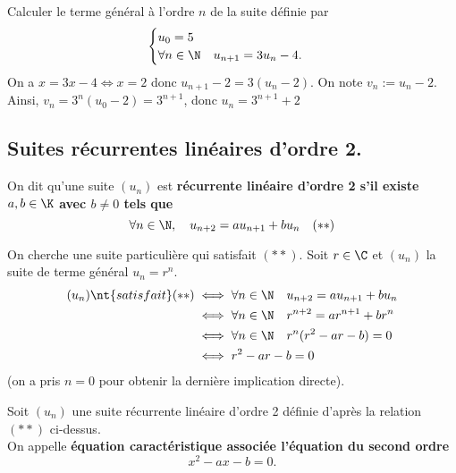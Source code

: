 \documentclass[11pt]{article}
\begin{document}
\begin{ex}{}{}
    Calculer le terme général à l'ordre $n$ de la suite définie par
    \begin{equation*}
        \begin{cases}
            u_0 = 5\\
            \forall n \in \N \quad u_{n+1} = 3u_n - 4.
        \end{cases}
    \end{equation*}
    \tcblower
    On a $x=3x-4\iff x=2$ donc $u_{n+1}-2=3(u_n-2)$. On note $v_n:=u_n-2$.\\
    Ainsi, $v_n=3^n(u_0-2)=3^{n+1}$, donc $u_n=3^{n+1}+2$
\end{ex}

\subsection{Suites récurrentes linéaires d'ordre 2.}

\begin{defi}{}{}
    On dit qu'une suite $(u_n)$ est \bf{récurrente linéaire d'ordre 2} s'il existe $a,b\in\K$ avec $b\neq0$ tels que
    \begin{equation*}
        \forall n \in \N, \quad u_{n+2}=au_{n+1}+bu_n \quad (**)
    \end{equation*}
\end{defi}
On cherche une suite particulière qui satisfait $(**)$. Soit $r\in\C$ et $(u_n)$ la suite de terme général $u_n=r^n$.
\begin{align*}
    (u_n) \nt{ satisfait } (**) &\iff \forall n \in \N \quad u_{n+2} = au_{n+1} + bu_n\\
    &\iff \forall n \in \N \quad r^{n+2} = ar^{n+1} + br^n\\
    &\iff \forall n \in \N \quad r^n(r^2 - ar - b) = 0\\
    &\iff r^2 - ar - b = 0
\end{align*}
(on a pris $n=0$ pour obtenir la dernière implication directe).

\begin{defi}{}{}
    Soit $(u_n)$ une suite récurrente linéaire d'ordre 2 définie d'après la relation $(**)$ ci-dessus.\\
    On appelle \bf{équation caractéristique} associée l'équation du second ordre
    \begin{equation*}
        x^2 -ax - b = 0.
    \end{equation*}
\end{defi}
\end{document}
